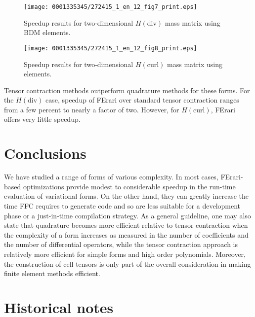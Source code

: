 \begin{figure}[!p]
\vspace*{-10pt}
\bwfig
\centering
\texttt{[image: 0001335345/272415\_1\_en\_12\_fig7\_print.eps]}
\caption{Speedup results for two-dimensional $H(\mathrm{div})$
mass matrix  using BDM elements.}
\label{fig:MassHdiv}
\end{figure}

\begin{figure}[!p]
\bwfig
\centering
\texttt{[image: 0001335345/272415\_1\_en\_12\_fig8\_print.eps]}
\caption{Speedup results for two-dimensional $ H(\mathrm{curl}) $
mass matrix using \nedelec{} elements.}
\label{fig:MassHcurl}\vspace*{6pt}
\end{figure}


Tensor contraction methods outperform quadrature methods for these
forms. For the $ H(\mathrm{div}) $ case, speedup of FErari over
standard tensor contraction ranges from a few percent to nearly a
factor of two. However, for $ H(\mathrm{curl}) $, FErari offers very
little speedup.

\section{Conclusions}

We have studied a range of forms of various complexity. In most cases,
FErari-based optimizations provide modest to considerable speedup in
the run-time evaluation of variational forms. On the other hand, they
can greatly increase the time FFC requires to generate code and so are
less suitable for a development phase or a just-in-time compilation
strategy. As a general guideline, one may also state that quadrature
becomes more efficient relative to tensor contraction when the
complexity of a form increases as measured in the number of
coefficients and the number of differential operators, while the
tensor contraction approach is relatively more efficient for simple
forms and high order polynomials. Moreover, the construction of
cell tensors is only part of the overall consideration in making
finite element methods efficient.

\section{Historical notes}

